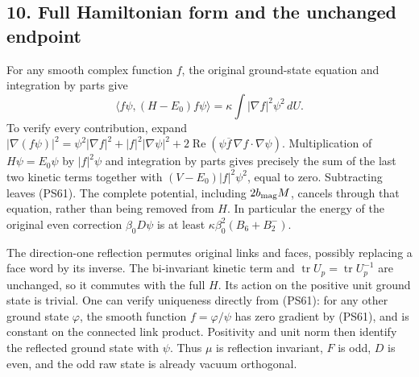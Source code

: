 \documentclass[11pt]{article}
\begin{document}
\subsection*{10. Full Hamiltonian form and the unchanged endpoint}

For any smooth complex function \(f\), the original ground-state
equation and integration by parts give
\[
 \langle f\psi,(H-E_0)f\psi\rangle
                  =\kappa\int|\nabla f|^2\psi^2\,dU.
 \tag{PS61}
\]
To verify every contribution, expand
\(|\nabla(f\psi)|^2
=\psi^2|\nabla f|^2+|f|^2|\nabla\psi|^2
+2\operatorname{Re}(\psi\overline f\,\nabla f\cdot\nabla\psi)\).
Multiplication of \(H\psi=E_0\psi\) by \(|f|^2\psi\) and
integration by parts gives precisely the sum of the last two
kinetic terms together with
\((V-E_0)|f|^2\psi^2\), equal to zero. Subtracting leaves (PS61).
The complete potential, including \(2b_{\rm mag}M\), cancels
through that equation, rather than being removed from \(H\).
In particular the energy of the original even correction
\(\beta_0D\psi\) is at least
\(\kappa\beta_0^2(B_6+B_2^-)\).

The direction-one reflection permutes original links and faces,
possibly replacing a face word by its inverse. The bi-invariant
kinetic term and \(\operatorname{tr}U_p=\operatorname{tr}U_p^{-1}\)
are unchanged, so it commutes with the full \(H\).
Its action on the positive unit ground state is trivial. One can
verify uniqueness directly from (PS61): for any other ground
state \(\varphi\), the smooth function \(f=\varphi/\psi\)
has zero gradient by (PS61), and is constant on the connected
link product. Positivity and unit norm then identify the reflected
ground state with \(\psi\). Thus \(\mu\) is reflection invariant,
\(F\) is odd, \(D\) is even, and the odd raw state is already
vacuum orthogonal.
\end{document}
